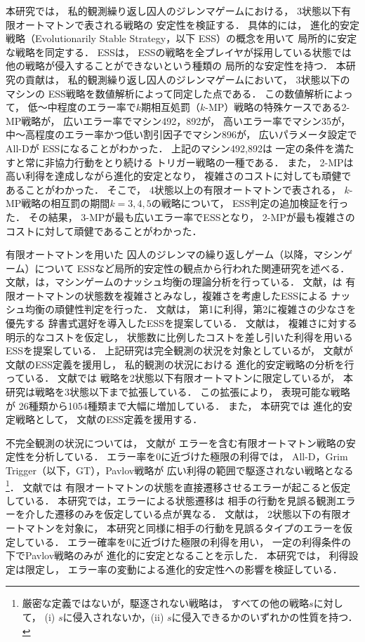 \documentclass[submit]{ipsj}
\theoremstyle{definition}
\begin{document}
本研究では，
私的観測繰り返し囚人のジレンマゲームにおける，
3状態以下有限オートマトンで表される戦略の
安定性を検証する．
具体的には，
進化的安定戦略（Evolutionarily Stable Strategy，以下 ESS）の概念を用いて
局所的に安定な戦略を同定する．
ESSは，
ESSの戦略を全プレイヤが採用している状態では
他の戦略が侵入することができないという種類の
局所的な安定性を持つ\cite{Smith-1973}．
本研究の貢献は，
私的観測繰り返し囚人のジレンマゲームにおいて，
3状態以下のマシンの
ESS戦略を数値解析によって同定した点である．
この数値解析によって，
低〜中程度のエラー率で$k$期相互処罰（$k$-MP）戦略の特殊ケースである2-MP戦略が，
広いエラー率でマシン492，892が，
高いエラー率でマシン35が，
中〜高程度のエラー率かつ低い割引因子でマシン896が，
広いパラメータ設定でAll-Dが
ESSになることがわかった．
上記のマシン492,892は
一定の条件を満たすと常に非協力行動をとり続ける
トリガー戦略の一種である．
また，
2-MPは高い利得を達成しながら進化的安定となり，
複雑さのコストに対しても頑健であることがわかった．
そこで，
4状態以上の有限オートマトンで表される，
$k$-MP戦略の相互罰の期間$k = 3, 4, 5$の戦略について，
ESS判定の追加検証を行った．
その結果，
3-MPが最も広いエラー率でESSとなり，
2-MPが最も複雑さのコストに対して頑健であることがわかった．

有限オートマトンを用いた
囚人のジレンマの繰り返しゲーム（以降，マシンゲーム）について
ESSなど局所的安定性の観点から行われた関連研究を述べる．
文献\cite{Rubinstein-1986}，\cite{Abreu-1988}は，マシンゲームのナッシュ均衡の理論分析を行っている．
文献\cite{Binmore-1992}，\cite{Cooper-1996}は
有限オートマトンの状態数を複雑さとみなし，複雑さを考慮したESSによる
ナッシュ均衡の頑健性判定を行った．
文献\cite{Binmore-1992}は，
第1に利得，第2に複雑さの少なさを優先する
辞書式選好を導入したESSを提案している．
文献\cite{Cooper-1996}は，
複雑さに対する明示的なコストを仮定し，
状態数に比例したコストを差し引いた利得を用いる
ESSを提案している．
上記研究は完全観測の状況を対象としているが，
文献\cite{koike-2022}が
文献\cite{Binmore-1992}のESS定義を援用し，
私的観測の状況における
進化的安定戦略の分析を行っている．
文献\cite{koike-2022}では
戦略を2状態以下有限オートマトンに限定しているが，
本研究は戦略を3状態以下まで拡張している．
この拡張により，
表現可能な戦略が
26種類から1054種類まで大幅に増加している．
また，
本研究では
進化的安定戦略として，
文献\cite{Cooper-1996}のESS定義を援用する．

不完全観測の状況については，
文献\cite{Nowak-1995}が
エラーを含む有限オートマトン戦略の安定性を分析している．
エラー率を0に近づけた極限の利得では，
All-D，Grim Trigger（以下，GT），Pavlov戦略が
広い利得の範囲で駆逐されない戦略となる
\footnote{厳密な定義ではないが，駆逐されない戦略は，
すべての他の戦略$s$に対して，
(i) $s$に侵入されないか，(ii) $s$に侵入できるかのいずれかの性質を持つ．}．
文献\cite{Nowak-1995}では
有限オートマトンの状態を直接遷移させるエラーが起こると仮定している．
本研究では，エラーによる状態遷移は
相手の行動を見誤る観測エラーを介した遷移のみを仮定している点が異なる．
文献\cite{Posch-1999}は，
2状態以下の有限オートマトンを対象に，
本研究と同様に相手の行動を見誤るタイプのエラーを仮定している．
エラー確率を0に近づけた極限の利得を用い，
一定の利得条件の下でPavlov戦略のみが
進化的に安定となることを示した．
本研究では，
利得設定は限定し，
エラー率の変動による進化的安定性への影響を検証している．
\end{document}
